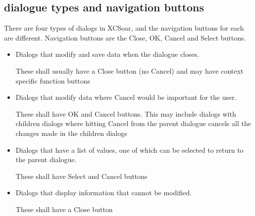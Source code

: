 \documentclass[a4paper,12pt]{refrep}
\begin{document}
\subsection{dialogue types and navigation buttons}
There are four types of dialogs in XCSoar, and the navigation 
buttons for each are different.  
Navigation buttons are the Close, OK, Cancel and Select buttons.
\begin{itemize}
\item Dialogs that modify and save data when the dialogue closes.

These shall usually have a Close button (no Cancel) and may have context specific 
function buttons
\item Dialogs that modify data where Cancel would be important for the user.

These shall have OK and Cancel buttons.  This may include dialogs with 
children dialogs where hitting Cancel from the parent dialogue cancels 
all the changes made in the children dialogs

\item Dialogs that have a list of values, one of which can be selected to 
 return to the parent dialogue.

These shall have Select and Cancel buttons
\item Dialogs that display information that cannot be modified.

These shall have a Close button
\end{itemize}
\end{document}
